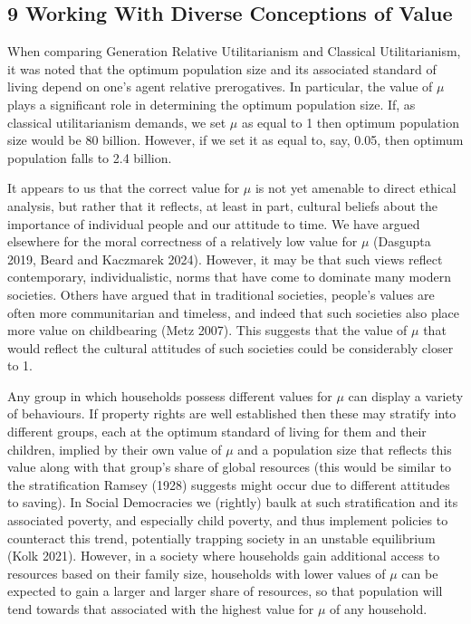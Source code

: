 \documentclass[man,11pt,a4paper,floatsintext]{apa7}
\begin{document}
\subsection{9 Working With Diverse Conceptions of Value}

When comparing Generation Relative Utilitarianism and Classical Utilitarianism, it was noted that the optimum population size and its associated standard of living depend on one's agent relative prerogatives. In particular, the value of $\mu$ plays a significant role in determining the optimum population size. If, as classical utilitarianism demands, we set $\mu$ as equal to 1 then optimum population size would be 80 billion. However, if we set it as equal to, say, 0.05, then optimum population falls to 2.4 billion.

It appears to us that the correct value for $\mu$ is not yet amenable to direct ethical analysis, but rather that it reflects, at least in part, cultural beliefs about the importance of individual people and our attitude to time. We have argued elsewhere for the moral correctness of a relatively low value for $\mu$ (Dasgupta 2019, Beard and Kaczmarek 2024). However, it may be that such views reflect contemporary, individualistic, norms that have come to dominate many modern societies. Others have argued that in traditional societies, people's values are often more communitarian and timeless, and indeed that such societies also place more value on childbearing (Metz 2007). This suggests that the value of $\mu$ that would reflect the cultural attitudes of such societies could be considerably closer to 1.

Any group in which households possess different values for $\mu$ can display a variety of behaviours. If property rights are well established then these may stratify into different groups, each at the optimum standard of living for them and their children, implied by their own value of $\mu$ and a population size that reflects this value along with that group's share of global resources (this would be similar to the stratification Ramsey (1928) suggests might occur due to different attitudes to saving). In Social Democracies we (rightly) baulk at such stratification and its associated poverty, and especially child poverty, and thus implement policies to counteract this trend, potentially trapping society in an unstable equilibrium (Kolk 2021). However, in a society where households gain additional access to resources based on their family size, households with lower values of $\mu$ can be expected to gain a larger and larger share of resources, so that population will tend towards that associated with the highest value for $\mu$ of any household.
\end{document}
